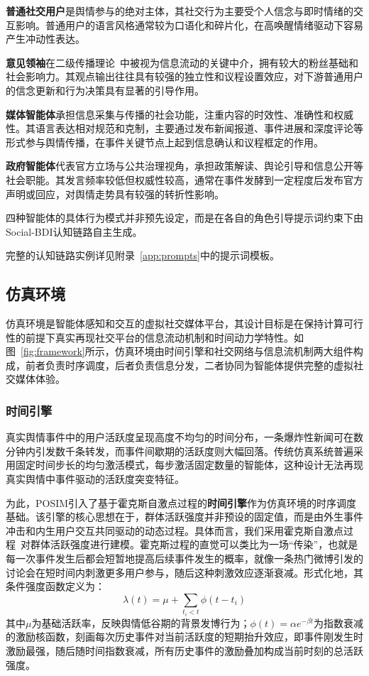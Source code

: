 \documentclass[a4paper,fleqn]{cas-dc}
\begin{document}
\textbf{普通社交用户}是舆情参与的绝对主体，其社交行为主要受个人信念与即时情绪的交互影响。普通用户的语言风格通常较为口语化和碎片化，在高唤醒情绪驱动下容易产生冲动性表达。

\textbf{意见领袖}在二级传播理论~\citep{katz_personal_1955}中被视为信息流动的关键中介，拥有较大的粉丝基础和社会影响力。其观点输出往往具有较强的独立性和议程设置效应，对下游普通用户的信念更新和行为决策具有显著的引导作用。

\textbf{媒体智能体}承担信息采集与传播的社会功能，注重内容的时效性、准确性和权威性。其语言表达相对规范和克制，主要通过发布新闻报道、事件进展和深度评论等形式参与舆情传播，在事件关键节点上起到信息确认和议程框定的作用。

\textbf{政府智能体}代表官方立场与公共治理视角，承担政策解读、舆论引导和信息公开等社会职能。其发言频率较低但权威性较高，通常在事件发酵到一定程度后发布官方声明或回应，对舆情走势具有较强的转折性影响。

四种智能体的具体行为模式并非预先设定，而是在各自的角色引导提示词约束下由Social-BDI认知链路自主生成。

完整的认知链路实例详见附录~\ref{app:prompts}中的提示词模板。

\subsection{仿真环境}\label{subsec:env}

仿真环境是智能体感知和交互的虚拟社交媒体平台，其设计目标是在保持计算可行性的前提下真实再现社交平台的信息流动机制和时间动力学特性。如图~\ref{fig:framework}所示，仿真环境由时间引擎和社交网络与信息流机制两大组件构成，前者负责时序调度，后者负责信息分发，二者协同为智能体提供完整的虚拟社交媒体体验。

\subsubsection{时间引擎}

真实舆情事件中的用户活跃度呈现高度不均匀的时间分布，一条爆炸性新闻可在数分钟内引发数千条转发，而事件间歇期的活跃度则大幅回落。传统仿真系统普遍采用固定时间步长的均匀激活模式，每步激活固定数量的智能体，这种设计无法再现真实舆情中事件驱动的活跃度突变特征。

为此，POSIM引入了基于霍克斯自激点过程的\textbf{时间引擎}作为仿真环境的时序调度基础。该引擎的核心思想在于，群体活跃强度并非预设的固定值，而是由外生事件冲击和内生用户交互共同驱动的动态过程。具体而言，我们采用霍克斯自激点过程~\citep{hawkes_spectra_1971}对群体活跃强度进行建模。霍克斯过程的直觉可以类比为一场“传染”，也就是每一次事件发生后都会短暂地提高后续事件发生的概率，就像一条热门微博引发的讨论会在短时间内刺激更多用户参与，随后这种刺激效应逐渐衰减。形式化地，其条件强度函数定义为：
\begin{equation}
\lambda(t) = \mu + \sum_{t_i < t} \phi(t - t_i)
\label{eq:hawkes}
\end{equation}
其中$\mu$为基础活跃率，反映舆情低谷期的背景发博行为；$\phi(t) = \alpha e^{-\beta t}$为指数衰减的激励核函数，刻画每次历史事件对当前活跃度的短期抬升效应，即事件刚发生时激励最强，随后随时间指数衰减，所有历史事件的激励叠加构成当前时刻的总活跃强度。
\end{document}
